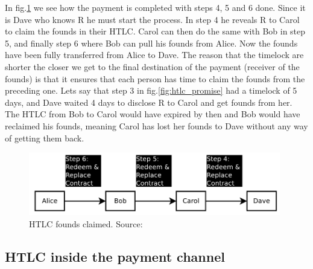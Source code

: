 In fig.\ref{fig:htlc_settle} we see how the payment is completed with steps 4, 5 and 6 done. Since it is Dave who knows R he must start the process. In step 4 he reveals R to Carol to claim the founds in their HTLC. Carol can then do the same with Bob in step 5, and finally step 6 where Bob can pull his founds from Alice.
Now the founds have been fully transferred from Alice to Dave.
The reason that the timelock are shorter the closer we get to the final destination of the payment (receiver of the founds) is that it ensures that each person has time to claim the founds from the preceding one. Lets say that step 3 in fig.\ref{fig:htlc_promise} had a timelock of 5 days, and Dave waited 4 days to disclose R to Carol and get founds from her. The HTLC from Bob to Carol would have expired by then and Bob would have reclaimed his founds, meaning Carol has lost her founds to Dave without any way of getting them back.

\begin{figure}[h]
    \centering
    \includegraphics[width=11cm]{figures/htlc_settle.png}
    \caption{HTLC founds claimed. Source: \cite{poon2015bitcoin}}
    \label{fig:htlc_settle}
\end{figure}


\subsection{HTLC inside the payment channel}

